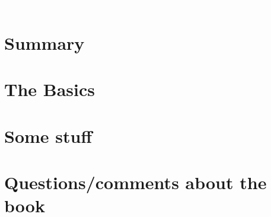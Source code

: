 \documentclass[12pt]{article}
\begin{document}



	

	



	

	{\textcolor{white}.}

	



	

	\section*{Summary}

	

	\section*{The Basics}

	

	\section*{Some stuff}



	\section*{Questions/comments about the book}

	

	

	
\end{document}
